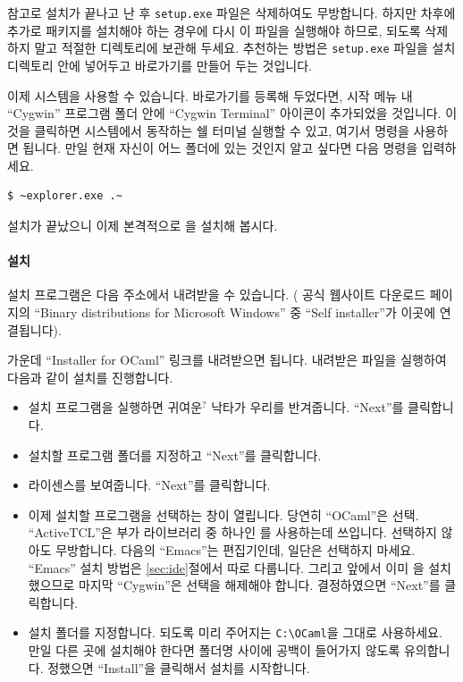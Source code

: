 참고로 설치가 끝나고 난 후 \texttt{setup.exe} 파일은 삭제하여도
무방합니다. 하지만 차후에 추가로 패키지를 설치해야 하는 경우에 다시 이 파일을
실행해야 하므로, 되도록 삭제하지 말고 적절한 디렉토리에 보관해 두세요. 추천하는
방법은 \texttt{setup.exe} 파일을 \CYGWIN{} 설치 디렉토리 안에 넣어두고
바로가기를 만들어 두는 것입니다.

이제 \CYGWIN{} 시스템을 사용할 수 있습니다. 바로가기를 등록해 두었다면,
시작 메뉴 내 ``Cygwin'' 프로그램 폴더 안에 ``Cygwin Terminal'' 아이콘이
추가되었을 것입니다. 이것을 클릭하면 \CYGWIN{} 시스템에서 동작하는 쉘 터미널
실행할 수 있고, 여기서 \UNIX{} 명령을 사용하면 됩니다. 만일 현재 자신이
\WINDOWS{} 어느 폴더에 있는 것인지 알고 싶다면 다음 명령을 입력하세요.

\begin{lstlisting}
$ ~explorer.exe .~
\end{lstlisting}

\CYGWIN{} 설치가 끝났으니 이제 본격적으로 \OCAML{}을 설치해 봅시다.

\paragraph{\OCAML{} 설치} \OCAML{} 설치 프로그램은 다음 주소에서
내려받을 수 있습니다. (\OCAML{} 공식 웹사이트 다운로드 페이지의 ``Binary
distributions for Microsoft Windows'' 중 ``Self installer''가 이곳에 연결됩니다).

\begin{center}
\end{center}

가운데 ``Installer for OCaml'' 링크를 내려받으면 됩니다. 내려받은 파일을
실행하여 다음과 같이 설치를 진행합니다.

\begin{itemize}
\item 설치 프로그램을 실행하면 귀여운$^?$ 낙타가 우리를 반겨줍니다. ``Next''를
  클릭합니다.
\item 설치할 프로그램 폴더를 지정하고 ``Next''를 클릭합니다.
\item \OCAML{} 라이센스를 보여줍니다. ``Next''를 클릭합니다.
\item 이제 설치할 프로그램을 선택하는 창이 열립니다. 당연히 ``OCaml''은
  선택. ``ActiveTCL''은 부가 라이브러리 중 하나인 \LABLTK{}를
  사용하는데 쓰입니다. 선택하지 않아도 무방합니다. 다음의 ``Emacs''는
  편집기인데, 일단은 선택하지 마세요. ``Emacs'' 설치 방법은
  \ref{sec:ide}절에서 따로 다룹니다. 그리고 앞에서 이미 \CYGWIN{}을
  설치했으므로 마지막 ``Cygwin''은 선택을 해제해야 합니다. 결정하였으면
  ``Next''를 클릭합니다.
\item \OCAML{} 설치 폴더를 지정합니다. 되도록 미리 주어지는
  \texttt{C:\textbackslash OCaml}을 그대로 사용하세요. 만일 다른 곳에 설치해야
  한다면 폴더명 사이에 공백이 들어가지 않도록 유의합니다. 정했으면
  ``Install''을 클릭해서 설치를 시작합니다.
\end{itemize}

